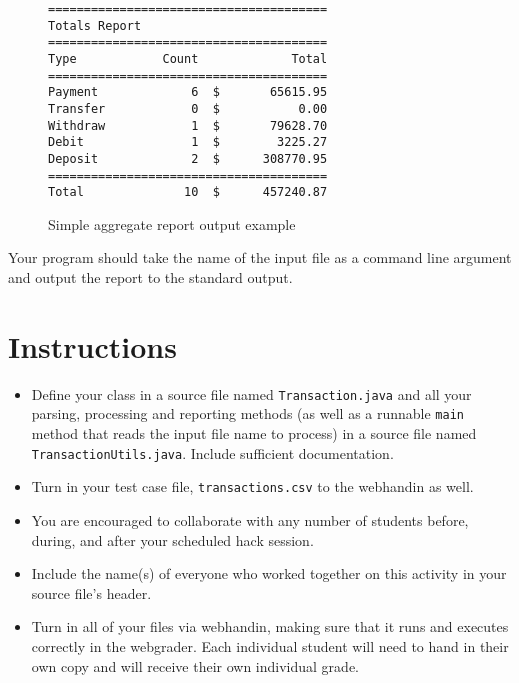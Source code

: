 \documentclass[12pt]{scrartcl}
\begin{document}
\begin{figure}[ht]
\begin{verbatim}
=======================================
Totals Report
=======================================
Type            Count             Total
=======================================
Payment             6  $       65615.95
Transfer            0  $           0.00
Withdraw            1  $       79628.70
Debit               1  $        3225.27
Deposit             2  $      308770.95
=======================================
Total              10  $      457240.87
\end{verbatim}
\caption{Simple aggregate report output example}
\label{figure:simpleReport}
\end{figure}

Your program should take the name of the input file as a command line argument
and output the report to the standard output.


\section*{Instructions}

\begin{itemize}

  \item Define your class in a source file named 
  \texttt{Transaction.java} and all your parsing, processing and
  reporting methods (as well as a runnable \texttt{main} method
  that reads the input file name to process) in a source file named
  \texttt{TransactionUtils.java}.  Include sufficient documentation.

  \item Turn in your test case file, \texttt{transactions.csv}
  to the webhandin as well.

  \item You are encouraged to collaborate with any number of students 
  before, during, and after your scheduled hack session.  

  \item Include the name(s) of everyone who worked together on
  this activity in your source file's header.

  \item Turn in all of your files via webhandin, making sure that 
  it runs and executes correctly in the webgrader.  Each individual 
  student will need to hand in their own copy and will receive 
  their own individual grade.
\end{itemize}  
\end{document}
